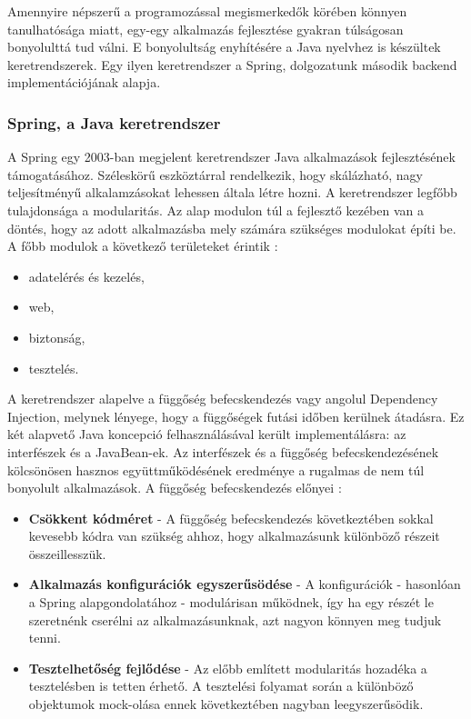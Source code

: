 \documentclass[12pt]{article}
\begin{document}
Amennyire népszerű a programozással megismerkedők körében könnyen tanulhatósága miatt, egy-egy alkalmazás fejlesztése gyakran túlságosan bonyolulttá tud válni. E bonyolultság enyhítésére a Java nyelvhez is készültek keretrendszerek. Egy ilyen keretrendszer a Spring, dolgozatunk második backend implementációjának alapja.

\subsubsection{Spring, a Java keretrendszer}

A Spring egy 2003-ban megjelent keretrendszer Java alkalmazások fejlesztésének támogatásához. Széleskörű eszköztárral rendelkezik, hogy skálázható, nagy teljesítményű alkalamzásokat lehessen általa létre hozni. A keretrendszer legfőbb tulajdonsága a modularitás. Az alap modulon túl a fejlesztő kezében van a döntés, hogy az adott alkalmazásba mely számára szükséges modulokat építi be. A főbb modulok a következő területeket érintik \cite{SPRING_BOOK}:
\begin{itemize}
\item adatelérés és kezelés,
\item web,
\item biztonság,
\item tesztelés.
\end{itemize}

A keretrendszer alapelve a függőség befecskendezés vagy angolul Dependency Injection, melynek lényege, hogy a függőségek futási időben kerülnek átadásra. Ez két alapvető Java koncepció felhasználásával került implementálásra: az interfészek és a JavaBean-ek. Az interfészek és a függőség befecskendezésének kölcsönösen hasznos együttműködésének eredménye a rugalmas de nem túl bonyolult alkalmazások. A függőség befecskendezés előnyei \cite{SPRING_BOOK}:
\begin{itemize}
	\item[]\textbf{Csökkent kódméret}
	- A függőség befecskendezés következtében sokkal kevesebb kódra van szükség ahhoz, hogy alkalmazásunk különböző részeit összeillesszük.
	\item[]\textbf{Alkalmazás konfigurációk egyszerűsödése}
	- A konfigurációk - hasonlóan a Spring alapgondolatához - modulárisan működnek, így ha egy részét le szeretnénk cserélni az alkalmazásunknak, azt nagyon könnyen meg tudjuk tenni.
	\item[]\textbf{Tesztelhetőség fejlődése}
	- Az előbb említett modularitás hozadéka a tesztelésben is tetten érhető. A tesztelési folyamat során a különböző objektumok mock-olása ennek következtében nagyban leegyszerűsödik.
\end{itemize}
\end{document}
